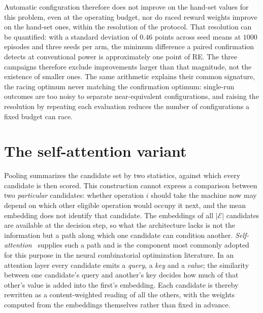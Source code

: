 \documentclass[preprint,authoryear,12pt]{elsarticle}
\begin{document}
Automatic configuration therefore does not improve on the hand-set
values for this problem, even at the operating budget, nor do raced
reward weights improve on the hand-set ones, within the resolution of
the protocol. That resolution can be quantified: with a standard
deviation of $0.46$ points across seed means at $1000$ episodes and
three seeds per arm, the minimum difference a paired confirmation
detects at conventional power is approximately one point of RE. The
three campaigns therefore exclude improvements larger than that
magnitude, not the existence of smaller ones. The same arithmetic
explains their common signature, the racing optimum never matching
the confirmation optimum: single-run outcomes are too noisy to
separate near-equivalent configurations, and raising the resolution
by repeating each evaluation reduces the number of configurations a
fixed budget can race.

\section{The self-attention variant}
\label{sup:attention}

Pooling summarizes the candidate set by two statistics, against which
every candidate is then scored. This construction cannot express a
comparison between two \emph{particular} candidates: whether
operation $i$ should take the machine now may depend on which other
eligible operation would occupy it next, and the mean embedding does
not identify that candidate. The embeddings of all
$|\mathcal{E}|$ candidates are available at the decision step, so
what the architecture lacks is not the information but a path along
which one candidate can condition another.
\emph{Self-attention}~\citep{Vaswani2017} supplies such a path and
is the component most commonly adopted for this purpose in the
neural combinatorial optimization literature. In an attention layer
every candidate emits a \emph{query}, a \emph{key} and a
\emph{value}; the similarity between one candidate's query and
another's key decides how much of that other's value is added into
the first's embedding. Each candidate is thereby rewritten as a
content-weighted reading of all the others, with the weights computed
from the embeddings themselves rather than fixed in advance.
\end{document}
